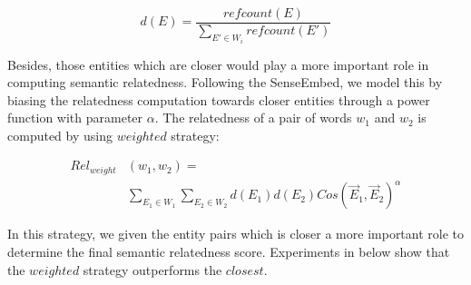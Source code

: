 \begin{small}
    \begin{equation}
        \label{cos}
        \nonumber
        d(E) = \frac{refcount(E)}{\sum_{{E}'\in W_i} refcount({E}')}
    \end{equation}
\end{small}

Besides, those entities which are closer would play a more important role in computing semantic relatedness.
Following the SenseEmbed, we model this by biasing the relatedness computation towards closer entities through a power function with
parameter $\alpha$. The relatedness of a pair of words $w_1$ and $w_2$ is computed by using $weighted$ strategy:

\begin{small}
    \begin{equation}
        \begin{split}
        \label{cos}
        \nonumber
        Rel_{weight}&(w_1, w_2)=\\ 
        &\sum_{E_1 \in W_1}\sum_{E_2 \in W_2}d(E_1)d(E_2)Cos(\overrightarrow E_1,\overrightarrow E_2)^\alpha 
        \end{split}
    \end{equation}
\end{small}

In this strategy, we given the entity pairs which is closer a more important role to determine the final semantic relatedness
score. Experiments in below show that the $weighted$ strategy outperforms the $closest$.


